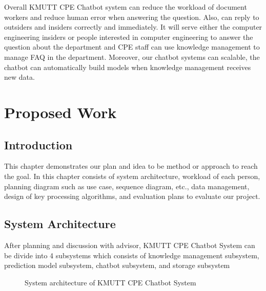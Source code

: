 \documentclass[12pt,oneside,openright,a4paper]{cpe-english-project}
\begin{document}
Overall KMUTT CPE Chatbot system can reduce the workload of document workers and reduce human
error when answering the question. Also, can reply to outsiders and insiders correctly and
immediately. It will serve either the computer engineering insiders or people interested in
computer engineering to answer the question about the department and CPE staff can use
knowledge management to manage FAQ in the department.
Moreover, our chatbot systems can scalable, the chatbot can automatically build models
when knowledge management receives new data.

\chapter{Proposed Work}

\section{Introduction}
This chapter demonstrates our plan and idea to be method or approach to reach the goal. In this chapter consists of system architecture, workload of each person, planning diagram such as use case, sequence diagram, etc., data management, design of key processing algorithms, and evaluation plans to evaluate our project.

\section{System Architecture}
\label{ch3_system_architecture}
After planning and discussion with advisor, KMUTT CPE Chatbot System can be divide into 4 subsystems which consists of knowledge management subsystem, prediction model subsystem, chatbot subsystem, and storage subsystem
\begin{figure}[h!]
	\centering
	\setlength{\fboxrule}{0.2mm}
	\setlength{\fboxsep}{0.5cm}
	\caption{System architecture of KMUTT CPE Chatbot System}
	\label{fig:System architecture of KMUTT CPE Chatbot System}
\end{figure}
\end{document}
